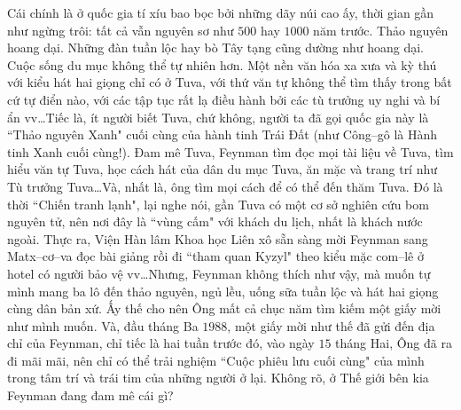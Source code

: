 \begin{multicols}{2}
\begin{figure}[H]
	\end{figure}
	Cái chính là ở quốc gia tí xíu bao bọc bởi những dãy núi cao ấy, thời gian gần như ngừng trôi: tất cả vẫn nguyên sơ như $500$ hay $1000$ năm trước. Thảo nguyên hoang dại. Những đàn tuần lộc hay bò Tây tạng cũng dường như hoang dại. Cuộc sống du mục không thể tự nhiên hơn. Một nền văn hóa xa xưa và kỳ thú với kiểu hát hai giọng chỉ có ở Tuva, với thứ văn tự không thể tìm thấy trong bất cứ tự điển nào, với các tập tục rất lạ điều hành bởi các tù trưởng uy nghi và bí ẩn vv\ldots Tiếc là, ít người biết Tuva, chứ không, người ta đã gọi quốc gia này là ``Thảo nguyên Xanh" cuối cùng của hành tinh Trái Đất (như Công--gô là Hành tinh Xanh cuối cùng!). Đam mê Tuva, Feynman tìm đọc mọi tài liệu về Tuva, tìm hiểu văn tự Tuva, học cách hát của dân du mục Tuva, ăn mặc và trang trí như Tù trưởng Tuva\ldots Và, nhất là, ông tìm mọi cách để có thể đến thăm Tuva.
	\vskip 0.1cm
	Đó là thời ``Chiến tranh lạnh", lại nghe nói, gần Tuva có một cơ sở nghiên cứu bom nguyên tử, nên nơi đây là ``vùng cấm" với khách du lịch, nhất là khách nước ngoài. Thực ra, Viện Hàn lâm Khoa học Liên xô sẵn sàng mời Feynman sang Matx--cơ--va đọc bài giảng rồi đi ``tham quan Kyzyl" theo kiểu mặc com--lê ở hotel có người bảo vệ vv\ldots Nhưng, Feynman không thích như vậy, mà muốn tự mình mang ba lô đến thảo nguyên, ngủ lều, uống sữa tuần lộc và hát hai giọng cùng dân bản xứ. Ấy thế cho nên Ông mất cả chục năm tìm kiếm một giấy mời như mình muốn. Và, đầu tháng Ba $1988$, một giấy mời như thế đã gửi đến địa chỉ của Feynman, chỉ tiếc là hai tuần trước đó, vào ngày $15$ tháng Hai, Ông đã ra đi mãi mãi, nên chỉ có thể trải nghiệm ``Cuộc phiêu lưu cuối cùng" của mình trong tâm trí và trái tim của những người ở lại. Không rõ, ở Thế giới bên kia Feynman đang đam mê cái gì?
\end{multicols}